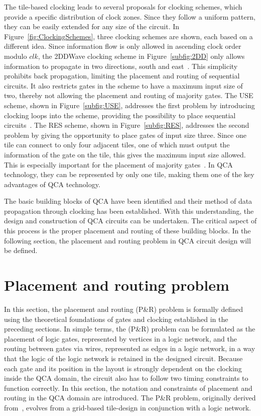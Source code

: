 The tile-based clocking leads to several proposals for clocking schemes, which provide a specific distribution of clock zones. Since they follow a uniform pattern, they can be easily extended for any size of the circuit. In Figure~\ref{fig:ClockingSchemes}, three clocking schemes are shown, each based on a different idea. Since information flow is only allowed in ascending clock order modulo $clk$, the 2DDWave clocking scheme in Figure~\ref{subfig:2DD} only allows information to propagate in two directions, south and east~\cite{2DD}. This simplicity prohibits back propagation, limiting the placement and routing of sequential circuits. It also restricts gates in the scheme to have a maximum input size of two, thereby not allowing the placement and routing of majority gates. The USE scheme, shown in Figure~\ref{subfig:USE}, addresses the first problem by introducing clocking loops into the scheme, providing the possibility to place sequential circuits~\cite{USE}. The RES scheme, shown in Figure~\ref{subfig:RES}, addresses the second problem by giving the opportunity to place gates of input size three. Since one tile can connect to only four adjacent tiles, one of which must output the information of the gate on the tile, this gives the maximum input size allowed. This is especially important for the placement of majority gates~\cite{RES}. In QCA technology, they can be represented by only one tile, making them one of the key advantages of QCA technology.

The basic building blocks of QCA have been identified and their method of data propagation through clocking has been established. With this understanding, the design and construction of QCA circuits can be undertaken. The critical aspect of this process is the proper placement and routing of these building blocks. In the following section, the placement and routing problem in QCA circuit design will be defined.

\section{Placement and routing problem} \label{sec:PR}

In this section, the placement and routing (P\&R) problem is formally defined using the theoretical foundations of gates and clocking established in the preceding sections. In simple terms, the (P\&R) problem can be formulated as the placement of logic gates, represented by vertices in a logic network, and the routing between gates via wires, represented as edges in a logic network, in a way that the logic of the logic network is retained in the designed circuit. Because each gate and its position in the layout is strongly dependent on the clocking inside the QCA domain, the circuit also has to follow two timing constraints to function correctly. In this section, the notation and constraints of placement and routing in the QCA domain are introduced. The P\&R problem, originally derived from~\cite{Walter}, evolves from a grid-based tile-design in conjunction with a logic network.

